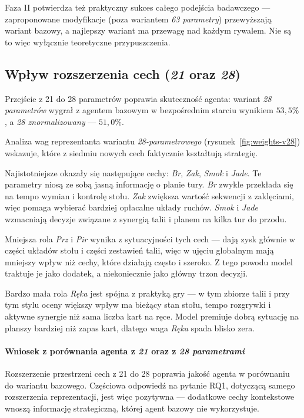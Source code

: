 Faza II potwierdza też praktyczny sukces całego podejścia badawczego --- zaproponowane modyfikacje (poza wariantem \textit{63 parametry}) przewyższają wariant bazowy, a najlepszy wariant ma przewagę nad każdym rywalem. Nie są to więc wyłącznie teoretyczne przypuszczenia.

\subsection{Wpływ rozszerzenia cech (\textit{21} oraz \textit{28})}

Przejście z 21 do 28 parametrów poprawia skuteczność agenta: wariant \textit{28 parametrów} wygrał z agentem bazowym w bezpośrednim starciu wynikiem \(53{,}5\%\), a \textit{28 znormalizowany} --- \(51{,}0\%\).



Analiza wag reprezentanta wariantu \textit{28-parametrowego} (rysunek~\ref{fig:weights-v28}) wskazuje, które z siedmiu nowych cech faktycznie kształtują strategię.

Najistotniejsze okazały się następujące cechy: \textit{Br}, \textit{Zak}, \textit{Smok} i \textit{Jade}. Te parametry niosą ze sobą jasną informację o planie tury. \textit{Br} zwykle przekłada się na tempo wymian i kontrolę stołu. \textit{Zak} zwiększa wartość sekwencji z zaklęciami, więc pomaga wybierać bardziej opłacalne układy ruchów. \textit{Smok} i \textit{Jade} wzmacniają decyzje związane z synergią talii i planem na kilka tur do przodu.

Mniejsza rola \textit{Prz} i \textit{Pir} wynika z sytuacyjności tych cech --- dają zysk głównie w części układów stołu i części zestawień talii, więc w ujęciu globalnym mają mniejszy wpływ niż cechy, które działają często i szeroko. Z tego powodu model traktuje je jako dodatek, a niekoniecznie jako główny trzon decyzji.

Bardzo mała rola \textit{Ręka} jest spójna z praktyką gry --- w tym zbiorze talii i przy tym stylu oceny większy wpływ ma bieżący stan stołu, tempo rozgrywki i aktywne synergie niż sama liczba kart na ręce. Model premiuje dobrą sytuację na planszy bardziej niż zapas kart, dlatego waga \textit{Ręka} spada blisko zera.

\paragraph{Wniosek z porównania agenta z \textit{21} oraz z \textit{28 parametrami}}
Rozszerzenie przestrzeni cech z 21 do 28 poprawia jakość agenta w porównaniu do wariantu bazowego. Częściowa odpowiedź na pytanie RQ1, dotyczącą samego rozszerzenia reprezentacji, jest więc pozytywna --- dodatkowe cechy kontekstowe wnoszą informację strategiczną, której agent bazowy nie wykorzystuje.


